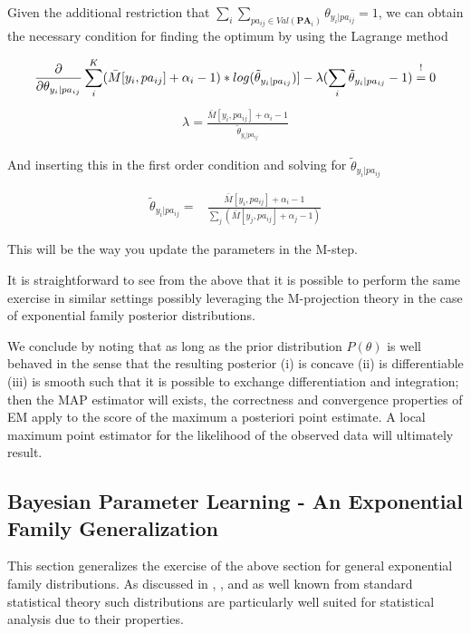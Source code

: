 \documentclass[11pt]{article}
\begin{document}
\begin{article}
Given the additional restriction that \(\sum_i \sum_{pa_{ij} \in
   Val(\textbf{PA}_i)} \theta_{y_i | pa_{ij}} = 1\), we can obtain the necessary
condition for finding the optimum by using the Lagrange method

\begin{align} \label{eq:first-order1}
\frac{\partial}{\partial \theta_{y_i | pa_{ij}}} \sum_i^K (\bar{M}[y_i, pa_{ij}] + \alpha_i - 1) * log(\tilde{\theta}_{y_i | pa_{ij}})] - \lambda (\sum_i \tilde{\theta}_{y_i | pa_{ij}} - 1) \mathrel{\stackon[5pt]{$=$}{$\scriptstyle!$}} 0
\end{align}
\begin{align} \label{eq:first-order2}
\lambda = \frac{\bar{M}[y_i, pa_{ij}] + \alpha_i - 1}{\tilde{\theta}_{y_i | pa_{ij}}}
\end{align}

And inserting this in the first order condition and solving for
\(\tilde{\theta}_{y_i | pa_{ij}}\)

\begin{align} \label{eq:solution}
\tilde{\theta}_{y_i | pa_{ij}} =& \frac{\bar{M}[y_i, pa_{ij}] + \alpha_i - 1}{\sum_j (\bar{M}[y_j, pa_{ij}] + \alpha_j - 1)}
\end{align}

This will be the way you update the parameters in the M-step.

It is straightforward to see from the above that it is possible to
perform the same exercise in similar settings possibly leveraging
the M-projection theory in the case of exponential family posterior
distributions. 

We conclude by noting that as long as the prior distribution
\(P(\theta)\) is well behaved in the sense that the resulting
posterior (i) is concave (ii) is differentiable (iii) is smooth
such that it is possible to exchange differentiation and
integration; then the MAP estimator will exists, the correctness
and convergence properties of EM apply to the score of the maximum
a posteriori point estimate. A local maximum point estimator for
the likelihood of the observed data will ultimately result.

\subsection{Bayesian Parameter Learning - An Exponential Family Generalization}
\label{sec:org3d7f451}

This section generalizes the exercise of the above section for
general exponential family distributions. As discussed in
\cite{barndorff1978hyperbolic}, \cite{geiger1998asymptotic},
\cite{lauritzen1996graphical} and as well known from standard
statistical theory such distributions are particularly well suited
for statistical analysis due to their properties. 


\end{article}
\end{document}
